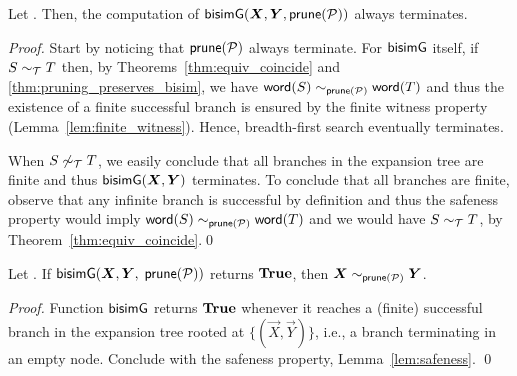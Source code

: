 \begin{lemma}[Termination]
  \label{lem:termination}
  Let \grmcontext. Then, the computation of $\Bisim(\vec X,\vec Y, \Prune(\productions))$
  always terminates.
\end{lemma}
%
\begin{proof}
  Start by noticing that $\mathsf{prune}(\mathcal P)$ always terminate.
  For $\mathsf{bisimG}$ itself, if $S\sim_\mathcal T T$ then, by
  Theorems~\ref{thm:equiv_coincide} and
  \ref{thm:pruning_preserves_bisim}, we have
  $\mathsf{word}(S) \sim_{\mathsf{prune}(\mathcal P)} \mathsf{word}(T) $ and thus the
  existence of a finite successful branch is ensured by the finite
  witness property (Lemma~\ref{lem:finite_witness}).  Hence,
  breadth-first search eventually terminates.
  
  When $S\not\sim_\mathcal T T$, we easily conclude that all branches in
  the expansion tree are finite and thus $\Bisim(\vec X,\vec Y)$
  terminates.  To conclude that all branches are finite, observe that
  any infinite branch is successful by definition and thus the
  safeness property would imply $\mathsf{word}(S) \sim_{\mathsf{prune}(\mathcal P)} \mathsf{word}(T)$ 
  and we would have
  $S\sim_\mathcal T T$, by Theorem~\ref{thm:equiv_coincide}.\qed
\end{proof}


\begin{lemma}
  \label{lem:bisimilar-to-prod}
  \begin{sloppypar}
  	Let \grmcontext.  If 
  $\Bisim(\vec X,\vec Y,$ $ \mathsf{prune}(\mathcal P))$ returns $\mathbf{True}$, then
  $\vec X \sim_{\Prune(\productions)} \vec Y$.
  \end{sloppypar}
\end{lemma}

\begin{proof}
  Function $\mathsf{bisimG}$ returns $\mathbf{True}$ whenever it reaches a (finite)
  successful branch in the expansion tree rooted at
  $\{(\vec X,\vec Y)\}$, i.e., a branch terminating in an empty node. 
  Conclude with the safeness property,
  Lemma~\ref{lem:safeness}. \qed
\end{proof}

